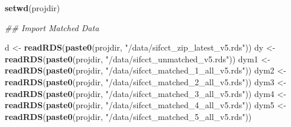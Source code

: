 \documentclass[
]{article}
\newenvironment{Shaded}{\begin{snugshade}}{\end{snugshade}}
\newcommand{\CommentTok}[1]{\textcolor[rgb]{0.56,0.35,0.01}{\textit{#1}}}
\newcommand{\KeywordTok}[1]{\textcolor[rgb]{0.13,0.29,0.53}{\textbf{#1}}}
\newcommand{\NormalTok}[1]{#1}
\newcommand{\StringTok}[1]{\textcolor[rgb]{0.31,0.60,0.02}{#1}}
\begin{document}
\begin{Shaded}
\begin{Highlighting}[]
\KeywordTok{setwd}\NormalTok{(projdir)}

\CommentTok{## Import Matched Data}

\NormalTok{d <-}\StringTok{ }\KeywordTok{readRDS}\NormalTok{(}\KeywordTok{paste0}\NormalTok{(projdir, }\StringTok{"/data/sifcct_zip_latest_v5.rds"}\NormalTok{))}
\NormalTok{dy <-}\StringTok{ }\KeywordTok{readRDS}\NormalTok{(}\KeywordTok{paste0}\NormalTok{(projdir, }\StringTok{"/data/sifcct_unmatched_v5.rds"}\NormalTok{))}
\NormalTok{dym1 <-}\StringTok{ }\KeywordTok{readRDS}\NormalTok{(}\KeywordTok{paste0}\NormalTok{(projdir, }\StringTok{"/data/sifcct_matched_1_all_v5.rds"}\NormalTok{))}
\NormalTok{dym2 <-}\StringTok{ }\KeywordTok{readRDS}\NormalTok{(}\KeywordTok{paste0}\NormalTok{(projdir, }\StringTok{"/data/sifcct_matched_2_all_v5.rds"}\NormalTok{))}
\NormalTok{dym3 <-}\StringTok{ }\KeywordTok{readRDS}\NormalTok{(}\KeywordTok{paste0}\NormalTok{(projdir, }\StringTok{"/data/sifcct_matched_3_all_v5.rds"}\NormalTok{))}
\NormalTok{dym4 <-}\StringTok{ }\KeywordTok{readRDS}\NormalTok{(}\KeywordTok{paste0}\NormalTok{(projdir, }\StringTok{"/data/sifcct_matched_4_all_v5.rds"}\NormalTok{))}
\NormalTok{dym5 <-}\StringTok{ }\KeywordTok{readRDS}\NormalTok{(}\KeywordTok{paste0}\NormalTok{(projdir, }\StringTok{"/data/sifcct_matched_5_all_v5.rds"}\NormalTok{))}


\end{Highlighting}
\end{Shaded}
\end{document}
